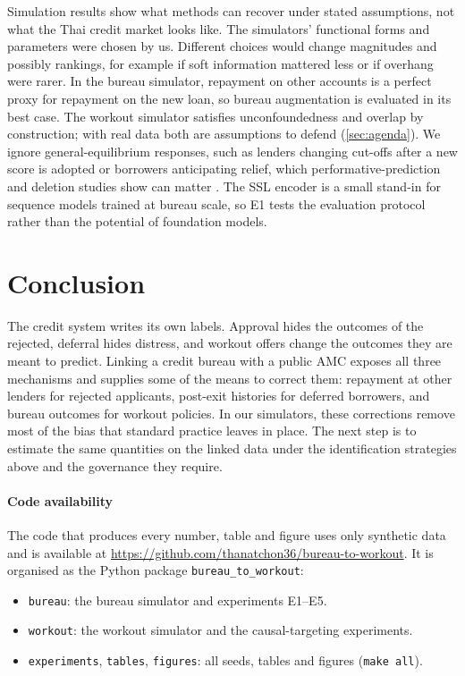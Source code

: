 \documentclass[10pt]{article}
\begin{document}
Simulation results show what methods can recover under stated assumptions, not what the Thai credit market looks like. The simulators' functional forms and parameters were chosen by us. Different choices would change magnitudes and possibly rankings, for example if soft information mattered less or if overhang were rarer. In the bureau simulator, repayment on other accounts is a perfect proxy for repayment on the new loan, so bureau augmentation is evaluated in its best case. The workout simulator satisfies unconfoundedness and overlap by construction; with real data both are assumptions to defend (\cref{sec:agenda}). We ignore general-equilibrium responses, such as lenders changing cut-offs after a new score is adopted or borrowers anticipating relief, which performative-prediction and deletion studies show can matter \citep{perdomo2020,liberman2018}. The SSL encoder is a small stand-in for sequence models trained at bureau scale, so E1 tests the evaluation protocol rather than the potential of foundation models.

\section{Conclusion}\label{sec:conclusion}

The credit system writes its own labels. Approval hides the outcomes of the rejected, deferral hides distress, and workout offers change the outcomes they are meant to predict. Linking a credit bureau with a public AMC exposes all three mechanisms and supplies some of the means to correct them: repayment at other lenders for rejected applicants, post-exit histories for deferred borrowers, and bureau outcomes for workout policies. In our simulators, these corrections remove most of the bias that standard practice leaves in place. The next step is to estimate the same quantities on the linked data under the identification strategies above and the governance they require.

\paragraph{Code availability} The code that produces every number, table and figure uses only synthetic data and is available at \url{https://github.com/thanatchon36/bureau-to-workout}. It is organised as the Python package \texttt{bureau\_to\_workout}:
\begin{itemize}[leftmargin=1.4em,itemsep=0pt,topsep=2pt]
  \item \texttt{bureau}: the bureau simulator and experiments E1--E5.
  \item \texttt{workout}: the workout simulator and the causal-targeting experiments.
  \item \texttt{experiments}, \texttt{tables}, \texttt{figures}: all seeds, tables and figures (\texttt{make all}).
\end{itemize}
\end{document}

